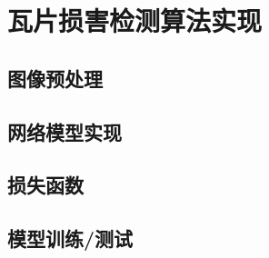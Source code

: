\section{瓦片损害检测算法实现}
\setcounter{figure}{0}

\subsection{图像预处理}

\subsection{网络模型实现}

\subsection{损失函数}

\subsection{模型训练/测试}
